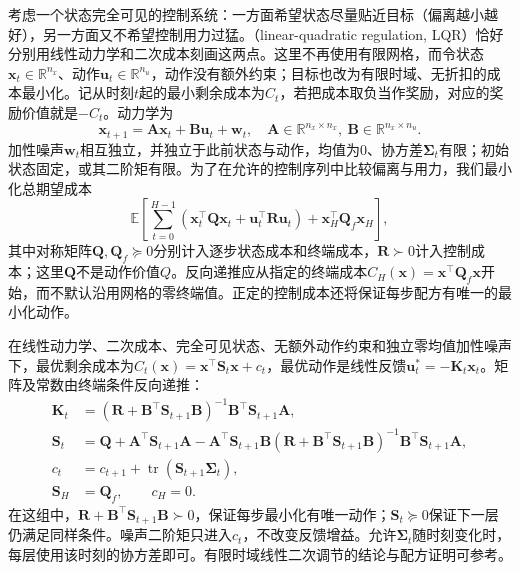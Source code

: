 考虑一个状态完全可见的控制系统：一方面希望状态尽量贴近目标（偏离越小越好），另一方面又不希望控制用力过猛。（linear-quadratic regulation, LQR）恰好分别用线性动力学和二次成本刻画这两点。这里不再使用有限网格，而令状态$\bm x_t\in\mathbb R^{n_x}$、动作$\bm u_t\in\mathbb R^{n_u}$，动作没有额外约束；目标也改为有限时域、无折扣的成本最小化。记从时刻$t$起的最小剩余成本为$C_t$，若把成本取负当作奖励，对应的奖励价值就是$-C_t$。动力学为
\[
 \bm x_{t+1}=\bm A\bm x_t+\bm B\bm u_t+\bm w_t,
 \quad
 \bm A\in\mathbb R^{n_x\times n_x},\
 \bm B\in\mathbb R^{n_x\times n_u}.
\]
加性噪声$\bm w_t$相互独立，并独立于此前状态与动作，均值为0、协方差$\bm\Sigma_t$有限；初始状态固定，或其二阶矩有限。为了在允许的控制序列中比较偏离与用力，我们最小化总期望成本
\begin{equation}
 \mathbb E\!\left[
 \sum_{t=0}^{H-1}
  (\bm x_t^\top\bm Q\bm x_t+\bm u_t^\top\bm R\bm u_t)
 +\bm x_H^\top\bm Q_f\bm x_H\right],
 \label{eq:rl-planning-lqr-cost}
\end{equation}
其中对称矩阵$\bm Q,\bm Q_f\succeq0$分别计入逐步状态成本和终端成本，$\bm R\succ0$计入控制成本；这里$\bm Q$不是动作价值$Q$。反向递推应从指定的终端成本$C_H(\bm x)=\bm x^\top\bm Q_f\bm x$开始，而不默认沿用网格的零终端值。正定的控制成本还将保证每步配方有唯一的最小化动作。

在线性动力学、二次成本、完全可见状态、无额外动作约束和独立零均值加性噪声下，最优剩余成本为$C_t(\bm x)=\bm x^\top\bm S_t\bm x+c_t$，最优动作是线性反馈$\bm u_t^*=-\bm K_t\bm x_t$。矩阵及常数由终端条件反向递推：
\begin{equation}
 \begin{aligned}
 \bm K_t&=(\bm R+\bm B^\top\bm S_{t+1}\bm B)^{-1}
                \bm B^\top\bm S_{t+1}\bm A,\\
 \bm S_t&=\bm Q+\bm A^\top\bm S_{t+1}\bm A
   -\bm A^\top\bm S_{t+1}\bm B
      (\bm R+\bm B^\top\bm S_{t+1}\bm B)^{-1}
      \bm B^\top\bm S_{t+1}\bm A,\\
 c_t&=c_{t+1}+\operatorname{tr}(\bm S_{t+1}\bm\Sigma_t),\\
 \bm S_H&=\bm Q_f,\qquad c_H=0.
 \end{aligned}
 \label{eq:rl-planning-riccati}
\end{equation}
在这组中，$\bm R+\bm B^\top\bm S_{t+1}\bm B\succ0$，保证每步最小化有唯一动作；$\bm S_t\succeq0$保证下一层仍满足同样条件。噪声二阶矩只进入$c_t$，不改变反馈增益。允许$\bm\Sigma_t$随时刻变化时，每层使用该时刻的协方差即可。有限时域线性二次调节的结论与配方证明可参考。

